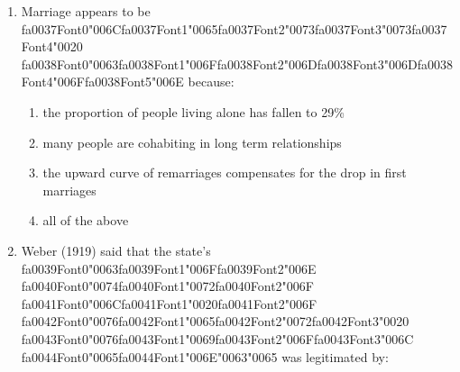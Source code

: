 \documentclass[12pt]{article}
\begin{document}
\begin{enumerate}[label=\arabic*.]
\begin{enumerate}[label=(\alph*)]
    \item there are no clearly defined projects into which the money can be directed
    \item the United Nations has refused to call on rich countries to provide it
    \item debt repayments with interest can be greater than the amount of money received
    \item debt repayments with interest can be greater than the amount of money received
\end{enumerate}
\item Marriage appears to be {\csname fa0037Font0\endcsname\char"006C}{\csname fa0037Font1\endcsname\char"0065}{\csname fa0037Font2\endcsname\char"0073}{\csname fa0037Font3\endcsname\char"0073}{\csname fa0037Font4\endcsname\char"0020} {\csname fa0038Font0\endcsname\char"0063}{\csname fa0038Font1\endcsname\char"006F}{\csname fa0038Font2\endcsname\char"006D}{\csname fa0038Font3\endcsname\char"006D}{\csname fa0038Font4\endcsname\char"006F}{\csname fa0038Font5\endcsname\char"006E} because:
\begin{enumerate}[label=(\alph*)]
    \item the proportion of people living alone has fallen to 29\%
    \item many people are cohabiting in long term relationships
    \item the upward curve of remarriages compensates for the drop in first marriages
    \item all of the above
\end{enumerate}
\item Weber (1919) said that the state's {\csname fa0039Font0\endcsname\char"0063}{\csname fa0039Font1\endcsname\char"006F}{\csname fa0039Font2\endcsname\char"006E} {\csname fa0040Font0\endcsname\char"0074}{\csname fa0040Font1\endcsname\char"0072}{\csname fa0040Font2\endcsname\char"006F} {\csname fa0041Font0\endcsname\char"006C}{\csname fa0041Font1\endcsname\char"0020}{\csname fa0041Font2\endcsname\char"006F} {\csname fa0042Font0\endcsname\char"0076}{\csname fa0042Font1\endcsname\char"0065}{\csname fa0042Font2\endcsname\char"0072}{\csname fa0042Font3\endcsname\char"0020} {\csname fa0043Font0\endcsname\char"0076}{\csname fa0043Font1\endcsname\char"0069}{\csname fa0043Font2\endcsname\char"006F}{\csname fa0043Font3\endcsname\char"006C} {\csname fa0044Font0\endcsname\char"0065}{\csname fa0044Font1\endcsname\char"006E}{\char"0063}{\char"0065} was legitimated by:

\end{enumerate}
\end{document}
